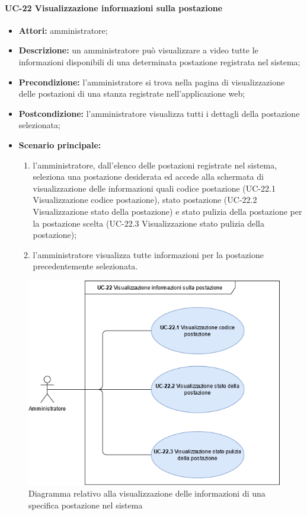 \paragraph{UC-22 Visualizzazione informazioni sulla postazione}
\begin{itemize}
    \item \textbf{Attori:} amministratore;
    \item \textbf{Descrizione:} un amministratore pu\`{o} visualizzare a video tutte le informazioni disponibili di una determinata postazione registrata nel sistema;
    \item \textbf{Precondizione:} l'amministratore si trova nella pagina di visualizzazione delle postazioni di una stanza registrate nell'applicazione web;
    \item \textbf{Postcondizione:} l'amministratore visualizza tutti i dettagli della postazione selezionata;
    \item \textbf{Scenario principale:}
    \begin{enumerate}
        \item l'amministratore, dall'elenco delle postazioni registrate nel sistema, seleziona una postazione desiderata ed accede alla schermata di visualizzazione delle informazioni quali codice postazione (UC-22.1 Visualizzazione codice postazione), stato postazione (UC-22.2 Visualizzazione stato della postazione) e stato pulizia della postazione per la postazione scelta (UC-22.3 Visualizzazione stato pulizia della postazione);
        \item l'amministratore visualizza tutte informazioni per la postazione precedentemente selezionata.
    \end{enumerate}
\end{itemize}

\begin{figure}[H]
    \centering
      \includegraphics[scale=0.50]{src/CasiDUso/immagini/InformazioniPostazione.png}
    \caption{Diagramma relativo alla visualizzazione delle informazioni di una specifica postazione nel sistema}
\end{figure}

